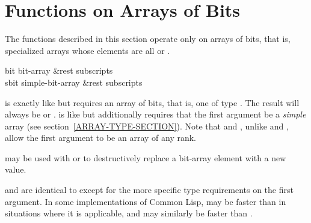 \section{Functions on Arrays of Bits}

The functions described in this section operate only
on arrays of bits, that is, specialized arrays whose elements
are all  or .

\begin{defun}[Function]
bit bit-array &rest subscripts \\
sbit simple-bit-array &rest subscripts

 is exactly like  but requires an array of bits,
that is, one of type .
The result will always be  or .
 is like  but additionally requires that the first
argument be a {\it simple} array (see section~\ref{ARRAY-TYPE-SECTION}).
Note that  and , unlike  and ,
allow the first argument to be an array of any rank.

 may be used with  or  to destructively replace
a bit-array element with a new value.

 and  are identical to  except for the
more specific type requirements on the first argument.
In some implementations of Common Lisp,
 may be faster than  in situations where it is applicable,
and  may similarly be faster than .
\end{defun}

